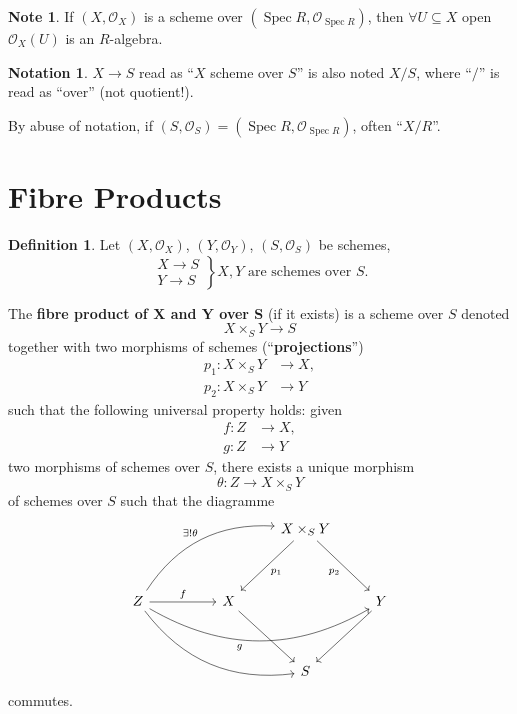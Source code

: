 \documentclass[12pt]{article}
\DeclareMathOperator{\Spec}{Spec}
\theoremstyle{definition}
\newtheorem*{definition}{Definition}
\newtheorem*{notation}{Notation}
\newtheorem*{note}{Note}
\begin{document}
\begin{note}
If $(X,\mathcal{O}_X)$ is a scheme over $(\Spec R,\mathcal{O}_{\Spec R})$, then $\forall U\subseteq X$ open $\mathcal{O}_X(U)$ is an $R$-algebra.
\end{note}

\begin{notation}
$X\rightarrow S$ read as ``$X$ scheme over $S$'' is also noted $X/S$, where ``$/$'' is read as ``over'' (not quotient!).

By abuse of notation, if $(S,\mathcal{O}_S)=(\Spec R,\mathcal{O}_{\Spec R})$, often ``$X/R$''.
\end{notation}

\section{Fibre Products}

\begin{definition}
Let $(X,\mathcal{O}_X)$, $(Y,\mathcal{O}_Y)$, $(S,\mathcal{O}_S)$ be schemes,
\[\left.\begin{array}{l}X\rightarrow S\\Y\rightarrow S\end{array}\right\}X,Y\text{ are schemes over }S.\]

The \textbf{fibre product of $\boldsymbol{X}$ and $\boldsymbol{Y}$ over S} (if it exists) is a scheme over $S$ denoted
\[X\times_SY\longrightarrow S\]
together with two morphisms of schemes (``\textbf{projections}'')
\begin{align*}
p_1:X\times_SY&\longrightarrow X,\\
p_2:X\times_SY&\longrightarrow Y
\end{align*}
such that the following universal property holds: given
\begin{align*}
f:Z&\longrightarrow X,\\
g:Z&\longrightarrow Y
\end{align*}
two morphisms of schemes over $S$, there exists a unique morphism
\[\theta:Z\longrightarrow X\times_SY\]
of schemes over $S$ such that the diagramme
\[
\begin{tikzcd}
&&&X\times_SY\arrow[ddl,"p_1"]\arrow[ddr,"p_2",swap]\\\\
Z\arrow[rr,"f"]\arrow[rrruu,bend left,"\exists!\theta"]\arrow[rrrr,bend right,"g\hspace{10mm}",swap]\arrow[rrrdd,bend right]&&X\arrow[rdd]&&Y\arrow[ldd]\\\\
&&&S
\end{tikzcd}
\]
commutes.
\end{definition}
\end{document}
